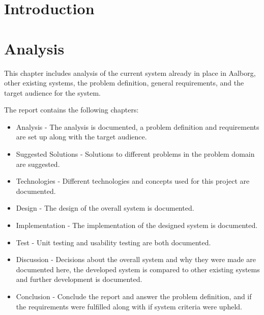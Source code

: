 
\usepackage[disable]{todonotes}					%
\usepackage[draft]{fixme}
\newcommand{\bycykelwithoutspace}{Aalborg Bycykel}
\newcommand{\bycykel}{\bycykelwithoutspace{ }}



	\BgThispage
	
	\clearpage
	\newpage\null\thispagestyle{empty}
	
	\addtocounter{page}{4}
	
	\newpage\null\thispagestyle{empty}\newpage
	\label{startoftoc}
	\begin{KeepFromToc}
		\tableofcontents
		\newpage\null\thispagestyle{empty}\newpage
		\todototoc
		\listoftodos
	\end{KeepFromToc}
	\label{endoftoc}
	
	\chapter{Introduction}
	
	\chapter{Analysis}
	This chapter includes analysis of the current system already in place in Aalborg, other existing systems, the problem definition, general requirements, and the target audience for the system.
	
	
	
	
	
	
	The report contains the following chapters:
	\begin{itemize}
	\item Analysis - The analysis is documented, a problem definition and requirements are set up along with the target audience.
	\item Suggested Solutions - Solutions to different problems in the problem domain are suggested.
	\item Technologies - Different technologies and concepts used for this project are documented.
	\item Design - The design of the overall system is documented.
	\item Implementation - The implementation of the designed system is documented.
	\item Test - Unit testing and usability testing are both documented. 
	\item Discussion - Decisions about the overall system and why they were made are documented here, the developed system is compared to other existing systems and further development is documented.
	\item Conclusion - Conclude the report and answer the problem definition, and if the requirements were fulfilled along with if system criteria were upheld.
	\end{itemize}
	
